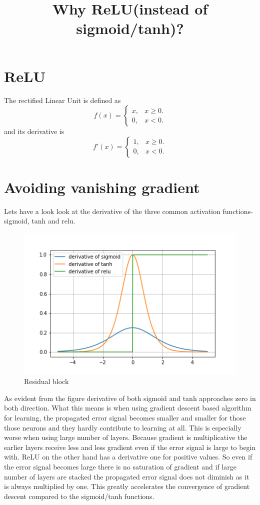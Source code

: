 \documentclass{article}
\title{Why ReLU(instead of sigmoid/tanh)?}
\author{}
\date{}
\begin{document}
\maketitle

\section*{ReLU}
The rectified Linear Unit is defined as 
\begin{equation*}
    f(x)=\begin{cases}
    x, & \text{$x \geqslant 0$}.\\
    0, & \text{$x<0$}.
    \end{cases}
\end{equation*}
and its derivative is
\begin{equation*}
    f'(x)=\begin{cases}
    1, & \text{$x\geqslant 0$}.\\
    0, & \text{$x<0$}.
    \end{cases}
\end{equation*}

\section*{Avoiding vanishing gradient}
Lets have a look look at the derivative of the three common activation functions- sigmoid, tanh and relu.
\begin{figure}[H]
    \centering
    \includegraphics[scale=0.75]{derivatives.png}
    \caption{Residual block}
    \label{fig:Figure 1}
\end{figure}
As evident from the figure derivative of both sigmoid and tanh approaches zero in both direction. What this means is when using gradient descent based algorithm for learning, the propagated error signal becomes smaller and smaller for those those neurons and they hardly contribute to learning at all. This is especially worse when using large number of layers. Because gradient is multiplicative the earlier layers receive less and less gradient even if the error signal is large to begin with. ReLU on the other hand has a derivative one for positive values. So even if the error signal becomes large there is no saturation of gradient and if large number of layers are stacked the propagated error signal does not diminish as it is always multiplied by one. This greatly accelerates the convergence of gradient descent compared to the sigmoid/tanh functions.
\end{document}
